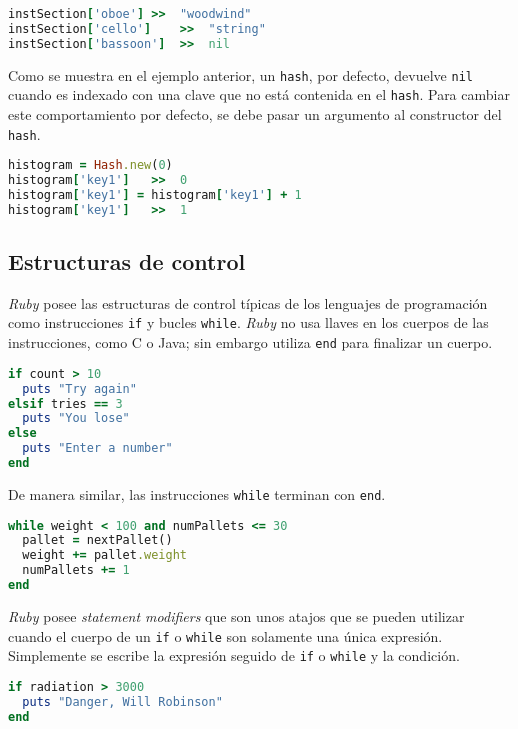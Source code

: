 \begin{lstlisting}[language=Ruby]
instSection['oboe']	>>	"woodwind"
instSection['cello']	>>	"string"
instSection['bassoon']	>>	nil
\end{lstlisting}

Como se muestra en el ejemplo anterior, un \texttt{hash}, por defecto, devuelve \texttt{nil} cuando es indexado con una clave que no está contenida en el \texttt{hash}.
Para cambiar este comportamiento por defecto, se debe pasar un argumento al constructor del \texttt{hash}.

\begin{lstlisting}[language=Ruby]
histogram = Hash.new(0)
histogram['key1']	>>	0
histogram['key1'] = histogram['key1'] + 1
histogram['key1']	>>	1
\end{lstlisting}

\subsection{Estructuras de control}
\textit{Ruby} posee las estructuras de control típicas de los lenguajes de programación como instrucciones \texttt{if} y bucles \texttt{while}. \textit{Ruby} no usa llaves en los cuerpos de las instrucciones, como C o Java; sin embargo utiliza \texttt{end} para finalizar un cuerpo.

\begin{lstlisting}[language=Ruby]
if count > 10
  puts "Try again"
elsif tries == 3
  puts "You lose"
else
  puts "Enter a number"
end
\end{lstlisting}

De manera similar, las instrucciones \texttt{while} terminan con \texttt{end}. 

\begin{lstlisting}[language=Ruby]
while weight < 100 and numPallets <= 30
  pallet = nextPallet()
  weight += pallet.weight
  numPallets += 1
end
\end{lstlisting}

\textit{Ruby} posee \textit{statement modifiers} que son unos atajos que se pueden utilizar cuando el cuerpo de un \texttt{if} o \texttt{while} son solamente una única expresión. Simplemente se escribe la expresión seguido de \texttt{if} o \texttt{while} y la condición.

\begin{lstlisting}[language=Ruby]
if radiation > 3000
  puts "Danger, Will Robinson"
end
\end{lstlisting}

